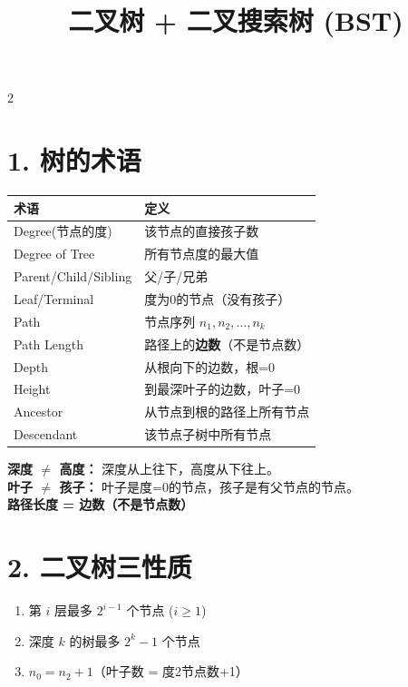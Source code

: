 \documentclass[10pt,a4paper]{article}
\title{\textbf{二叉树 + 二叉搜索树 (BST)}}
\author{}\date{}
\begin{document}
\maketitle\vspace{-8pt}

\begin{multicols}{2}

\section*{1. 树的术语}

\begin{tabular}{|l|l|}
\hline
\textbf{术语} & \textbf{定义} \\
\hline
Degree(节点的度) & 该节点的直接孩子数 \\
Degree of Tree & 所有节点度的最大值 \\
Parent/Child/Sibling & 父/子/兄弟 \\
Leaf/Terminal & 度为0的节点（没有孩子） \\
Path & 节点序列 $n_1,n_2,\dots,n_k$ \\
Path Length & 路径上的\textbf{边数}（不是节点数） \\
Depth & 从根向下的边数，根=0 \\
Height & 到最深叶子的边数，叶子=0 \\
Ancestor & 从节点到根的路径上所有节点 \\
Descendant & 该节点子树中所有节点 \\
\hline
\end{tabular}

\begin{keybox}
\textbf{深度 $\neq$ 高度：} 深度从上往下，高度从下往上。\\
\textbf{叶子 $\neq$ 孩子：} 叶子是度=0的节点，孩子是有父节点的节点。\\
\textbf{路径长度 = 边数（不是节点数）}
\end{keybox}

\section*{2. 二叉树三性质}

\begin{enumerate}
\item 第 $i$ 层最多 $2^{i-1}$ 个节点 ($i\ge 1$)
\item 深度 $k$ 的树最多 $2^{k}-1$ 个节点
\item \textbf{$n_0 = n_2 + 1$}（叶子数 = 度2节点数+1）
\end{enumerate}


\end{multicols}
\end{document}
